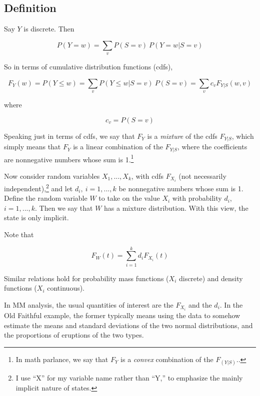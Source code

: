 \documentclass[11pt]{article}
\begin{document}
\subsection{Definition}
\label{mixdef}

Say $Y$ is discrete.  Then

\begin{equation}
P(Y = w) = \sum_{v} P(S = v) ~ P(Y = w | S = v)
\end{equation}

So in terms of cumulative distribution functions (cdfs),

\begin{equation}
\label{mixedFs}
F_Y(w) = P(Y \leq w) = 
\sum_{v} P(Y \leq w | S = v) ~ P(S = v) =
\sum_{v} c_v F_{Y|S}(w,v)
\end{equation}

where 

\begin{equation}
c_v = P(S = v)
\end{equation}

Speaking just in terms of cdfs, we say that $F_Y$ is a \textit{mixture}
of the cdfs $F_{Y|S}$, which simply means that $F_Y$ is a linear
combination of the $F_{Y|S}$, where the coefficients are nonnegative
numbers whose sum is 1.\footnote{In math parlance, we say that $F_Y$ is
a \textit{convex} combination of the $F_{(Y|S)}$..}

Now consider random variables $X_1,...,X_k$, with cdfs $F_{X_i}$ (not
necessarily independent),\footnote{I use ``X'' for my variable name
rather than ``Y,'' to emphasize the mainly implicit nature of states.}
and let $d_i, ~ i=1,...,k$ be nonnegative
numbers whose sum is 1.  Define the random variable $W$ to take on the
value $X_i$ with probability $d_i$, $i=1,...,k$.  Then we say that $W$
has a mixture distribution.  With this view, the state is only implicit.

Note that

\begin{equation}
F_{W}(t) = \sum_{i=1}^k d_i F_{X_i}(t)
\end{equation}

Similar relations hold for probability mass functions ($X_i$ discrete)
and density functions ($X_i$ continuous).

In MM analysis, the usual quantities of interest are the 
$F_{X_i}$ and the $d_i$.  In the Old Faithful example, the former 
typically means using the data to somehow estimate the means and
standard deviations of the two normal distributions, and the proportions
of eruptions of the two types.
\end{document}
